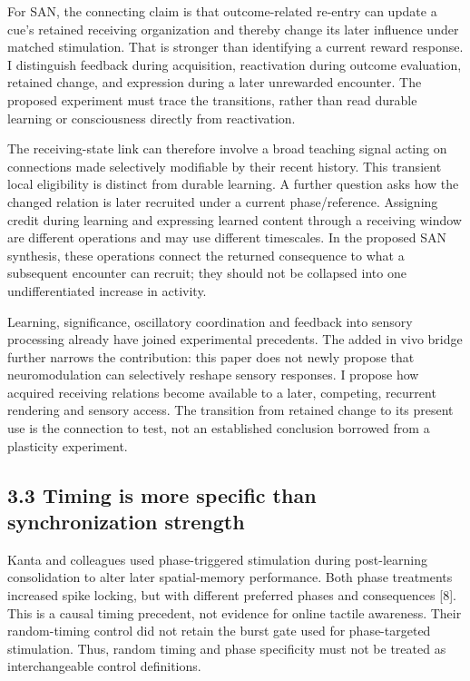 \documentclass[
  american,
  11pt,
  letterpaper,
]{article}
\begin{document}
For SAN, the connecting claim is that outcome-related re-entry can update a cue's retained receiving organization and thereby change its later influence under matched stimulation. That is stronger than identifying a current reward response. I distinguish feedback during acquisition, reactivation during outcome evaluation, retained change, and expression during a later unrewarded encounter. The proposed experiment must trace the transitions, rather than read durable learning or consciousness directly from reactivation.

The receiving-state link can therefore involve a broad teaching signal acting on connections made selectively modifiable by their recent history. This transient local eligibility is distinct from durable learning. A further question asks how the changed relation is later recruited under a current phase/reference. Assigning credit during learning and expressing learned content through a receiving window are different operations and may use different timescales. In the proposed SAN synthesis, these operations connect the returned consequence to what a subsequent encounter can recruit; they should not be collapsed into one undifferentiated increase in activity.

Learning, significance, oscillatory coordination and feedback into sensory processing already have joined experimental precedents. The added in vivo bridge further narrows the contribution: this paper does not newly propose that neuromodulation can selectively reshape sensory responses. I propose how acquired receiving relations become available to a later, competing, recurrent rendering and sensory access. The transition from retained change to its present use is the connection to test, not an established conclusion borrowed from a plasticity experiment.

\subsection{3.3 Timing is more specific than synchronization strength}\label{timing-is-more-specific-than-synchronization-strength}

Kanta and colleagues used phase-triggered stimulation during post-learning consolidation to alter later spatial-memory performance. Both phase treatments increased spike locking, but with different preferred phases and consequences {[}8{]}. This is a causal timing precedent, not evidence for online tactile awareness. Their random-timing control did not retain the burst gate used for phase-targeted stimulation. Thus, random timing and phase specificity must not be treated as interchangeable control definitions.
\end{document}
